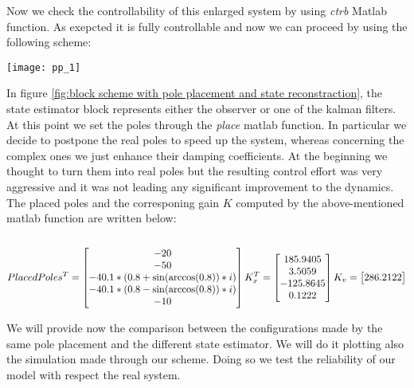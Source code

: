Now we check the controllability of this enlarged system by using \textit{ctrb} Matlab function.
As exepcted it is fully controllable and now we can proceed by using the following scheme:
\begin{figure*}[h]
	\centering
	\texttt{[image: pp\_1]}
	\caption{block scheme with pole placement and state reconstraction}
	\label{fig:block scheme with pole placement and state reconstraction}
\end{figure*}

\newpage

In figure \ref{fig:block scheme with pole placement and state reconstraction}, the state estimator block represents either the observer or one of the kalman filters. 
At this point we set the poles through the \textit{place} matlab function. In particular we decide to postpone the real poles to speed up the system, whereas concerning the complex ones we just enhance their damping coefficients. At the beginning we thought to turn them into real poles but the resulting control effort was very aggressive and it was not leading any significant improvement to the dynamics. The placed poles and the corresponing gain $K$ computed by the above-mentioned matlab function are written below:
\\\\

\begin{equation}
	PlacedPoles^{T} =
	\begin{bmatrix}
		-20 \\ -50 \\ -40.1*(0.8+\sin(\arccos(0.8))*i) \\ -40.1*(0.8-\sin(\arccos(0.8))*i) \\-10  
	\end{bmatrix}
		K_x^{T} =
	\begin{bmatrix}
		185.9405 \\  3.5059 \\ -125.8645 \\   0.1222
	\end{bmatrix}
	\\
	K_v =
	\begin{bmatrix}
		286.2122
	\end{bmatrix}
\end{equation}

We will provide now the comparison between the configurations made by the same pole placement and the different state estimator. We will do it plotting also the simulation made through our scheme. Doing so we test the reliability of our model with respect the real system.

